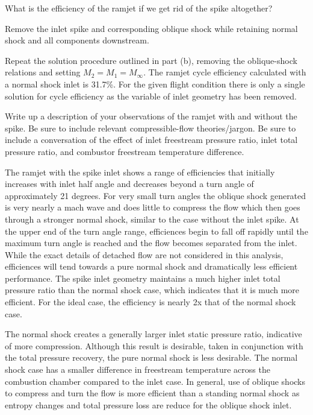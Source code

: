 \documentclass[../main.tex]{subfiles}
\begin{document}

What is the efficiency of the ramjet if we get rid of the spike altogether?

\assumptions{}
Remove the inlet spike and corresponding oblique shock while retaining normal shock and all components downstream.

\solution{}
Repeat the solution procedure outlined in part (b), removing the oblique-shock relations and setting \(M_2 = M_1 = M_\infty\).
The ramjet cycle efficiency calculated with a normal shock inlet is 31.7\%. 
For the given flight condition there is only a single solution for cycle efficiency as the variable of inlet geometry has been removed.



Write up a description of your observations of the ramjet with and without the spike.
Be sure to include relevant compressible-flow theories/jargon. 
Be sure to include a conversation of the effect of inlet freestream pressure ratio, inlet total pressure ratio, and combustor freestream temperature difference.

\discussion{}
The ramjet with the spike inlet shows a range of efficiencies that initially increases with inlet half angle and decreases beyond a turn angle of approximately 21 degrees.
For very small turn angles the oblique shock generated is very nearly a mach wave and does little to compress the flow which then goes through a stronger normal shock, similar to the case without the inlet spike.
At the upper end of the turn angle range, efficiences begin to fall off rapidly until the maximum turn angle is reached and the flow becomes separated from the inlet.
While the exact details of detached flow are not considered in this analysis, efficiences will tend towards a pure normal shock and dramatically less efficient performance.
The spike inlet geometry maintains a much higher inlet total pressure ratio than the normal shock case, which indicates that it is much more efficient.
For the ideal case, the efficiency is nearly 2x that of the normal shock case. 

The normal shock creates a generally larger inlet static pressure ratio, indicative of more compression.
Although this result is desirable, taken in conjunction with the total pressure recovery, the pure normal shock is less desirable.
The normal shock case has a smaller difference in freestream temperature across the combustion chamber compared to the inlet case.
In general, use of oblique shocks to compress and turn the flow is more efficient than a standing normal shock as entropy changes and total pressure loss are reduce for the oblique shock inlet.
\end{document}
